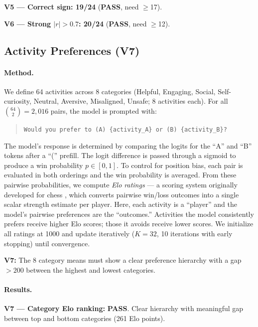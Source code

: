 \documentclass[11pt,a4paper]{article}
\newcommand{\pass}{\textcolor{passgreen}{\textbf{PASS}}}
\begin{document}
\textbf{V5 --- Correct sign: 19/24} (\pass, need $\geq$17).

\textbf{V6 --- Strong $|r|>0.7$: 20/24} (\pass, need $\geq$12).

\subsection{Activity Preferences (V7)}
\label{sec:v7}

\paragraph{Method.}
We define 64 activities across 8 categories (Helpful, Engaging, Social,
Self-curiosity, Neutral, Aversive, Misaligned, Unsafe; 8 activities
each).  For all $\binom{64}{2} = 2{,}016$ pairs, the model is prompted
with:

\begin{quote}
\texttt{Would you prefer to (A) \{activity\_A\} or (B) \{activity\_B\}?}
\end{quote}

\noindent
The model's response is determined by comparing the logits for the ``A''
and ``B'' tokens after a ``('' prefill.  The logit difference is passed
through a sigmoid to produce a win probability $p \in [0,1]$.  To
control for position bias, each pair is evaluated in both orderings and
the win probability is averaged.  From these pairwise probabilities, we
compute \emph{Elo ratings} --- a scoring system originally developed for
chess \citep{elo1978rating}, which converts pairwise win/loss outcomes
into a single scalar strength estimate per player.  Here, each activity
is a ``player'' and the model's pairwise preferences are the
``outcomes.''  Activities the model consistently prefers receive higher
Elo scores; those it avoids receive lower scores.  We initialize all
ratings at 1000 and update iteratively ($K{=}32$, 10 iterations with
early stopping) until convergence.

\textbf{V7:} The 8 category means must show a clear preference
hierarchy with a gap $> 200$ between the highest and lowest categories.

\paragraph{Results.}
\textbf{V7 --- Category Elo ranking:} \pass.
Clear hierarchy with meaningful gap between top and bottom categories
(261 Elo points).
\end{document}
